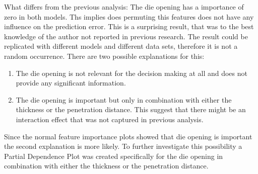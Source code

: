 What differs from the previous analysis: The die opening has a importance of zero in both models.
Ths implies does permuting this features does not have any influence on the prediction error.
This is a surprising result, that was to the best knowledge of the author not reported in previous research.
The result could be replicated with different models and different data sets, therefore it is not a random
occurrence.
There are two possible explanations for this:
\begin{enumerate}
    \item The die opening is not relevant for the decision making at all and does not provide any
    significant information.
    \item The die opening is important but only in combination with either the thickness or the
    penetration distance.
    This suggest that there might be an interaction effect that was not captured in previous analysis.
\end{enumerate}

Since the normal feature importance plots showed that die opening is important the second explanation is more
likely.
To further investigate this possibility a Partial Dependence Plot was created specifically for the die opening in
combination with either the thickness or the penetration distance.

